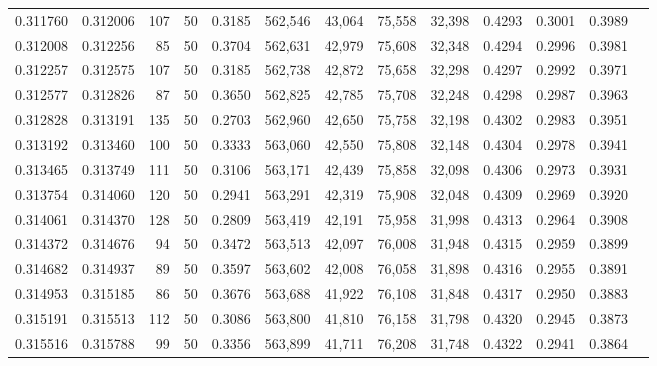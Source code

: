 \begin{tabular}{rrrrrrrrrrrrr}
0.311760 & 0.312006 &   107 &  50 &                                     0.3185 & 562,546 &  43,064 &  75,558 &  32,398 & 0.4293 & 0.3001 & 0.3989 \\
0.312008 & 0.312256 &    85 &  50 &                                     0.3704 & 562,631 &  42,979 &  75,608 &  32,348 & 0.4294 & 0.2996 & 0.3981 \\
0.312257 & 0.312575 &   107 &  50 &                                     0.3185 & 562,738 &  42,872 &  75,658 &  32,298 & 0.4297 & 0.2992 & 0.3971 \\
0.312577 & 0.312826 &    87 &  50 &                                     0.3650 & 562,825 &  42,785 &  75,708 &  32,248 & 0.4298 & 0.2987 & 0.3963 \\
0.312828 & 0.313191 &   135 &  50 &                                     0.2703 & 562,960 &  42,650 &  75,758 &  32,198 & 0.4302 & 0.2983 & 0.3951 \\
0.313192 & 0.313460 &   100 &  50 &                                     0.3333 & 563,060 &  42,550 &  75,808 &  32,148 & 0.4304 & 0.2978 & 0.3941 \\
0.313465 & 0.313749 &   111 &  50 &                                     0.3106 & 563,171 &  42,439 &  75,858 &  32,098 & 0.4306 & 0.2973 & 0.3931 \\
0.313754 & 0.314060 &   120 &  50 &                                     0.2941 & 563,291 &  42,319 &  75,908 &  32,048 & 0.4309 & 0.2969 & 0.3920 \\
0.314061 & 0.314370 &   128 &  50 &                                     0.2809 & 563,419 &  42,191 &  75,958 &  31,998 & 0.4313 & 0.2964 & 0.3908 \\
0.314372 & 0.314676 &    94 &  50 &                                     0.3472 & 563,513 &  42,097 &  76,008 &  31,948 & 0.4315 & 0.2959 & 0.3899 \\
0.314682 & 0.314937 &    89 &  50 &                                     0.3597 & 563,602 &  42,008 &  76,058 &  31,898 & 0.4316 & 0.2955 & 0.3891 \\
0.314953 & 0.315185 &    86 &  50 &                                     0.3676 & 563,688 &  41,922 &  76,108 &  31,848 & 0.4317 & 0.2950 & 0.3883 \\
0.315191 & 0.315513 &   112 &  50 &                                     0.3086 & 563,800 &  41,810 &  76,158 &  31,798 & 0.4320 & 0.2945 & 0.3873 \\
0.315516 & 0.315788 &    99 &  50 &                                     0.3356 & 563,899 &  41,711 &  76,208 &  31,748 & 0.4322 & 0.2941 & 0.3864 \\

\end{tabular}
